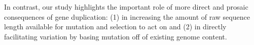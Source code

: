In contrast, our study highlights the important role of more direct and prosaic consequences of gene duplication: (1) in increasing the amount of raw sequence length available for mutation and selection to act on and (2) in directly facilitating variation by basing mutation off of existing genome content.



